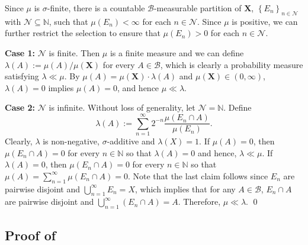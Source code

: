Since \(\mu\) is \(\sigma\)-finite, there is a countable
\(\mathcal{B}\)-measurable partition of \(\mathbf{X}\), \(\left\{ E_{n}
\right\}_{n \in \mathcal{N}}\) with \(\mathcal{N} \subseteq \mathbb{N}\), such
that \(\mu \left( E_{n} \right) < \infty\) for each \(n \in \mathcal{N}\).
Since \(\mu\) is positive, we can further restrict the selection to ensure that
\(\mu \left( E_{n} \right) > 0\) for each \(n \in \mathcal{N}\).

\textbf{Case 1:} \(\mathcal{N}\) is finite.
Then \(\mu\) is a finite measure and we can define \(\lambda (A) := \mu (A) /
\mu (\mathbf{X})\) for every \(A \in \mathcal{B}\), which is clearly a
probability measure satisfying \(\lambda \ll \mu\).
By \(\mu (A) = \mu (\mathbf{X}) \cdot \lambda (A)\) and \(\mu (\mathbf{X}) \in
(0, \infty)\), \(\lambda (A) = 0\) implies \(\mu (A) = 0\), and hence \(\mu \ll
\lambda\).

\textbf{Case 2:} \(\mathcal{N}\) is infinite.
Without loss of generality, let \(\mathcal{N} = \mathbb{N}\).
Define
\begin{equation*}
  \lambda (A) := \sum_{n = 1}^{\infty} 2^{- n} \frac{\mu \left( E_{n} \cap A
  \right)}{\mu \left( E_{n} \right)}.
\end{equation*}
Clearly, \(\lambda\) is non-negative, \(\sigma\)-additive and \(\lambda (X) =
1\).
If \(\mu (A) = 0\), then \(\mu \left( E_{n} \cap A \right) = 0\) for every \(n
\in \mathbb{N}\) so that \(\lambda (A) = 0\) and hence, \(\lambda \ll \mu\).
If \(\lambda (A) = 0\), then \(\mu \left( E_{n} \cap A \right) = 0\) for every
\(n \in \mathbb{N}\) so that \(\mu (A) = \sum_{n = 1}^{\infty} \mu \left( E_{n}
\cap A \right) = 0\).
Note that the last claim follows since \(E_{n}\) are pairwise disjoint and
\(\bigcup_{n = 1}^{\infty} E_{n} = X\), which implies that for any \(A \in
\mathcal{B}\), \(E_{n} \cap A\) are pairwise disjoint and \(\bigcup_{n =
1}^{\infty} \left( E_{n} \cap A \right) = A\).
Therefore, \(\mu \ll \lambda\).
\qed

\subsection{Proof of
\texorpdfstring{}{Theorem
\ref{thm--hellinger-diff-unaffected-by-dom}}}
\label{sec--prf--thm--hellinger-diff-unaffected-by-dom}


